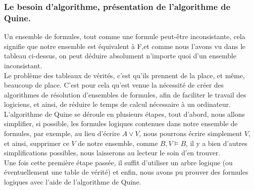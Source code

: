 \documentclass[a4paper, 12pt]{article}
\numberwithin{equation}{subsection}
\begin{document}
\subsubsection{Le besoin d'algorithme, présentation de l'algorithme de Quine.}

Un ensemble de formules, tout comme une formule peut-être inconsistante, cela signifie que notre ensemble est équivalent à F,et comme nous l'avons vu dans le tableau ci-dessus, on peut déduire absolument n'importe quoi d'un ensemble inconsistant.\\

Le problème des tableaux de vérités, c'est qu'ils prennent de la place, et même, beaucoup de place. C'est pour cela qu'est venue la nécessité de créer des algorithmes de résolution d'ensembles de formules, afin de faciliter le travail des logiciens, et ainsi, de réduire le temps de calcul nécessaire à un ordinateur. \\

L'algorithme de Quine se déroule en plusieurs étapes, tout d'abord, nous allons simplifier, si possible, les formules logiques contenues dans notre ensemble de formules, par exemple, au lieu d'écrire $A \lor V$, nous pourrons écrire simplement $ V $, et ainsi, supprimer ce $V$ de notre ensemble, comme $B, V \models B$, il y a bien d'autres simplifications possibles, nous laisserons au lecteur le soin d'en trouver.\\

Une fois cette première étape passée, il suffit d'utiliser un arbre logique (ou éventuellement une table de vérité) et enfin, nous avons pu prouver des formules logiques avec l'aide de l'algorithme de Quine.
\end{document}
